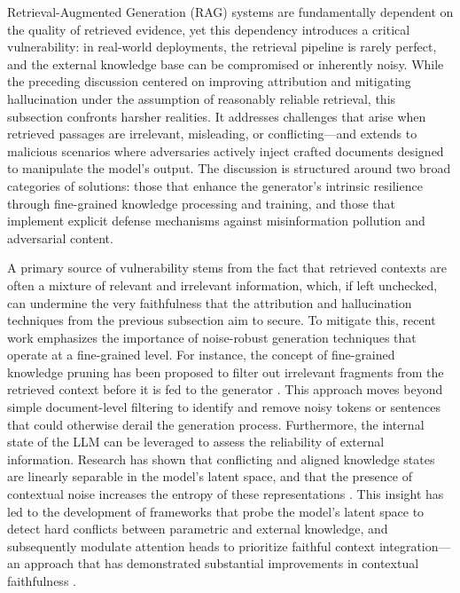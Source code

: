 \documentclass[11pt]{article}
\begin{document}
Retrieval-Augmented Generation (RAG) systems are fundamentally dependent on the quality of retrieved evidence, yet this dependency introduces a critical vulnerability: in real-world deployments, the retrieval pipeline is rarely perfect, and the external knowledge base can be compromised or inherently noisy. While the preceding discussion centered on improving attribution and mitigating hallucination under the assumption of reasonably reliable retrieval, this subsection confronts harsher realities. It addresses challenges that arise when retrieved passages are irrelevant, misleading, or conflicting---and extends to malicious scenarios where adversaries actively inject crafted documents designed to manipulate the model's output. The discussion is structured around two broad categories of solutions: those that enhance the generator's intrinsic resilience through fine-grained knowledge processing and training, and those that implement explicit defense mechanisms against misinformation pollution and adversarial content.

A primary source of vulnerability stems from the fact that retrieved contexts are often a mixture of relevant and irrelevant information, which, if left unchecked, can undermine the very faithfulness that the attribution and hallucination techniques from the previous subsection aim to secure. To mitigate this, recent work emphasizes the importance of noise-robust generation techniques that operate at a fine-grained level. For instance, the concept of fine-grained knowledge pruning has been proposed to filter out irrelevant fragments from the retrieved context before it is fed to the generator \cite{ref185}. This approach moves beyond simple document-level filtering to identify and remove noisy tokens or sentences that could otherwise derail the generation process. Furthermore, the internal state of the LLM can be leveraged to assess the reliability of external information. Research has shown that conflicting and aligned knowledge states are linearly separable in the model's latent space, and that the presence of contextual noise increases the entropy of these representations \cite{ref185}. This insight has led to the development of frameworks that probe the model's latent space to detect hard conflicts between parametric and external knowledge, and subsequently modulate attention heads to prioritize faithful context integration---an approach that has demonstrated substantial improvements in contextual faithfulness \cite{ref185}.
\end{document}
